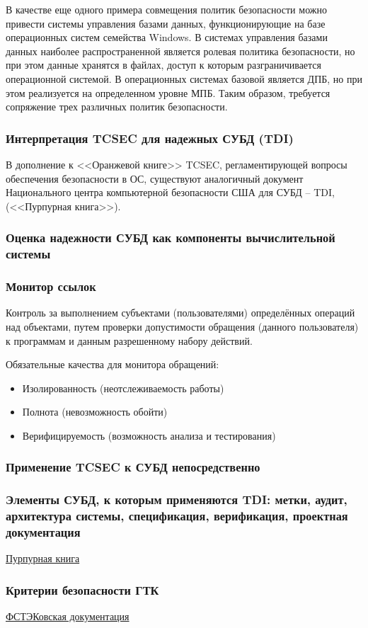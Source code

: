 В качестве еще одного примера совмещения политик безопасности можно привести системы управления базами данных, функционирующие на базе операционных систем семейства Windows. В системах управления базами данных наиболее распространенной является ролевая политика безопасности, но при этом данные хранятся в файлах, доступ к которым разграничивается операционной системой. В операционных системах базовой является ДПБ, но при этом реализуется на определенном уровне МПБ. Таким образом, требуется сопряжение трех различных политик безопасности.

\subsubsection{Интерпретация TCSEC для надежных СУБД (TDI)}
В дополнение к <<Оранжевой книге>> TCSEC, регламентирующей вопросы обеспечения безопасности в ОС, существуют аналогичный документ Национального центра компьютерной безопасности США для СУБД -- TDI, (<<Пурпурная книга>>).

\subsubsection{Оценка надежности СУБД как компоненты вычислительной системы}
\subsubsection{Монитор ссылок}
Контроль за выполнением субъектами (пользователями) определённых операций над объектами, путем проверки допустимости обращения (данного пользователя) к программам и данным разрешенному набору действий.

Обязательные качества для монитора обращений:
\begin{itemize}
	\item Изолированность (неотслеживаемость работы)
	\item Полнота (невозможность обойти)
	\item Верифицируемость (возможность анализа и тестирования)
\end{itemize}

\subsubsection{Применение TCSEC к СУБД непосредственно}
\subsubsection{Элементы СУБД, к которым применяются TDI: метки, аудит, архитектура системы, спецификация, верификация, проектная документация}
\href{https://web.archive.org/web/20160303230445/http://ftp.fas.org/irp/nsa/rainbow/tg021.htm}{Пурпурная книга}
\subsubsection{Критерии безопасности ГТК}
\href{https://fstec.ru/component/attachments/download/293}{ФСТЭКовская документация}



